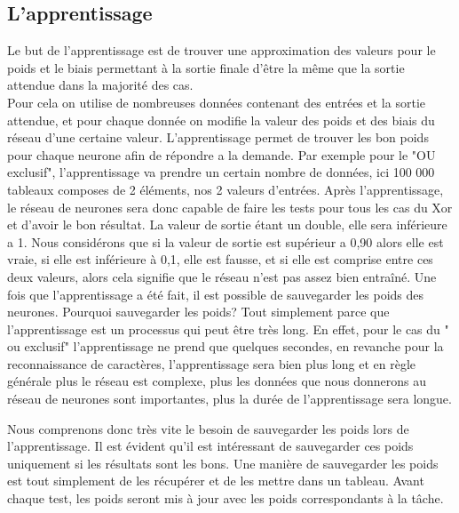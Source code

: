 \documentclass[14pt]{article}
\begin{document}
\subsection{L'apprentissage}
Le but de l'apprentissage est de trouver une approximation des valeurs pour le poids et le biais permettant à la sortie finale d'être la même que la sortie attendue dans la majorité des cas.\\
Pour cela on utilise de nombreuses données contenant des entrées et la sortie attendue, et pour chaque donnée on modifie la valeur des poids et des biais du réseau d'une certaine valeur. 
\newline
L'apprentissage permet de trouver les bon poids pour chaque neurone afin de répondre a la demande. Par exemple pour le "OU exclusif", l'apprentissage va prendre un certain nombre de données, ici 100 000 tableaux composes de 2 éléments, nos 2 valeurs d'entrées. Après l'apprentissage, le réseau de neurones sera donc capable de faire les tests pour tous les cas du Xor et d'avoir le bon résultat. 
La valeur de sortie étant un double, elle sera inférieure a 1. Nous considérons que si la valeur de sortie est supérieur a 0,90 alors elle est vraie, si elle est inférieure à 0,1, elle est fausse, et si elle est comprise entre ces deux valeurs, alors cela signifie que le réseau n'est pas assez bien entraîné.
\newline
Une fois que l'apprentissage a été fait, il est possible de sauvegarder les poids des neurones. Pourquoi sauvegarder les poids? Tout simplement parce que l'apprentissage est un processus qui peut être très long. En effet, pour le cas du " ou exclusif" l'apprentissage ne prend que quelques secondes, en revanche pour la reconnaissance de caractères, l'apprentissage sera bien plus long et en règle générale plus le réseau est complexe, plus les données que nous donnerons au réseau de neurones sont importantes, plus la durée de l'apprentissage sera longue.
\newpage

Nous comprenons donc très vite le besoin de sauvegarder les poids lors de l'apprentissage. Il est évident qu'il est intéressant de sauvegarder ces poids uniquement si les résultats sont les bons. Une manière de sauvegarder les poids est tout simplement de les récupérer et de les mettre dans un tableau. Avant chaque test, les poids seront mis à jour avec les poids correspondants à la tâche. 
\newpage
\end{document}
